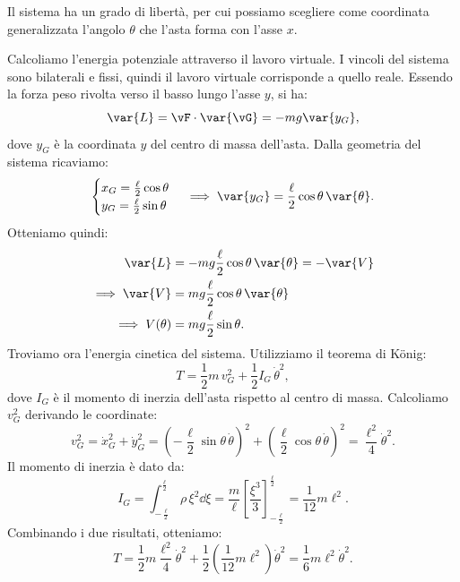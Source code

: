 \begin{example}
    Il sistema ha un grado di libertà, per cui possiamo scegliere come coordinata generalizzata l'angolo $\theta$ che l'asta forma con l'asse $x$.

    Calcoliamo l'energia potenziale attraverso il lavoro virtuale. I vincoli del sistema sono bilaterali e fissi, quindi il lavoro virtuale corrisponde a quello reale. Essendo la forza peso rivolta verso il basso lungo l'asse $y$, si ha:
    \begin{equation*}
        \var{L} = \vF\cdot \var{\vG} = -mg\var{y_G},
    \end{equation*}
    dove $y_G$ è la coordinata $y$ del centro di massa dell'asta. Dalla geometria del sistema ricaviamo:
    \begin{equation*}
        \begin{cases}
            x_G = \frac{\ell}{2}\cos\theta \\
            y_G = \frac{\ell}{2}\sin\theta \\    
        \end{cases}
        \implies \var{y_G} = \frac{\ell}{2}\cos\theta\,\var{\theta}.
    \end{equation*}
    Otteniamo quindi:
    \begin{align*}
        \var{L} &= -mg\frac{\ell}{2}\cos\theta\,\var{\theta} = -\var{V} \\
        \implies \var{V} &= mg\frac{\ell}{2}\cos\theta\,\var{\theta} \\
        \implies V(\theta) &= mg\frac{\ell}{2}\sin\theta.
    \end{align*}
    Troviamo ora l'energia cinetica del sistema. Utilizziamo il teorema di König:
    \begin{equation*}
        T= \frac{1}{2}m\,v_G^2 + \frac{1}{2}I_G\,\dot{\theta}^2,
    \end{equation*}
    dove $I_G$ è il momento di inerzia dell'asta rispetto al centro di massa.
    Calcoliamo $v_G^2$ derivando le coordinate:
    \begin{equation*}
        v_G^2 = \dot{x}_G^2 + \dot{y}_G^2 = \left(-\frac{\ell}{2}\sin\theta\,\dot{\theta}\right)^2 + \left(\frac{\ell}{2}\cos\theta\,\dot{\theta}\right)^2 = \frac{\ell^2}{4}\dot{\theta}^2.
    \end{equation*}
    Il momento di inerzia è dato da:
    \begin{equation*}
        I_G =  \int_{-\frac{\ell}{2}}^{\frac{\ell}{2}} \rho \,\xi^2 \dd{\xi} = \frac{m}{\ell} \left[\frac{\xi^3}{3}\right]_{-\frac{\ell}{2}}^{\frac{\ell}{2}} = \frac{1}{12}m\ell^2.
    \end{equation*}
    Combinando i due risultati, otteniamo:
    \begin{equation*}
        T = \frac{1}{2}m\frac{\ell^2}{4}\dot{\theta}^2 + \frac{1}{2}\left(\frac{1}{12}m\ell^2\right)\dot{\theta}^2 = \frac{1}{6}m\ell^2\dot{\theta}^2.
    \end{equation*}


\end{example}
